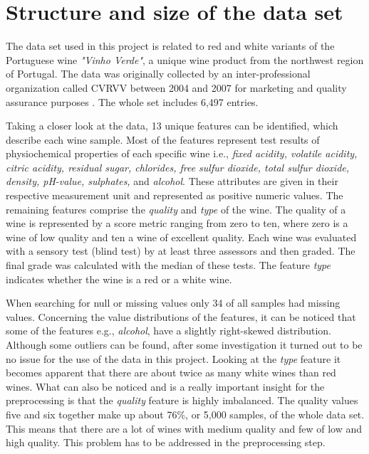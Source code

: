 \section{Structure and size of the data set}\label{sec:data_structure}


The data set used in this project is related to red and white variants of the Portuguese wine \textit{"Vinho Verde"}, a unique wine product from the northwest region of Portugal. The data was originally collected by an inter-professional organization called CVRVV between 2004 and 2007 for marketing and quality assurance purposes \citep{misc_wine_quality_186}. The whole set includes 6,497 entries.

Taking a closer look at the data, 13 unique features can be identified, which describe each wine sample. Most of the features represent test results of physiochemical properties of each specific wine i.e., \textit{fixed acidity, volatile acidity, citric acidity, residual sugar, chlorides, free sulfur dioxide, total sulfur dioxide, density, pH-value, sulphates,}  and \textit{alcohol}. These attributes are given in their respective measurement unit and represented as positive numeric values. The remaining features comprise the \textit{quality} and \textit{type} of the wine. The quality of a wine is represented by a score metric ranging from zero to ten, where zero is a wine of low quality and ten a wine of excellent quality. Each wine was evaluated with a sensory test (blind test) by at least three assessors and then graded. The final grade was calculated with the median of these tests. The feature \textit{type} indicates whether the wine is a red or a white wine.

When searching for null or missing values only 34 of all samples had missing values. Concerning the value distributions of the features, it can be noticed that some of the features e.g., \textit{alcohol}, have a slightly right-skewed distribution. Although some outliers can be found, after some investigation it turned out to be no issue for the use of the data in this project. Looking at the \textit{type} feature it becomes apparent that there are about twice as many white wines than red wines. What can also be noticed and is a really important insight for the preprocessing is that the \textit{quality} feature is highly imbalanced. The quality values five and six together make up about 76\%, or 5,000 samples, of the whole data set. This means that there are a lot of wines with medium quality and few of low and high quality. This problem has to be addressed in the preprocessing step.
\pagebreak